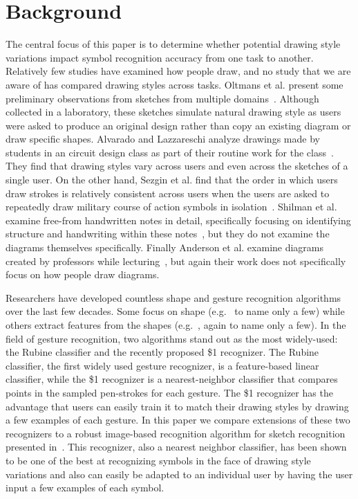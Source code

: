 \documentclass{egpubl}
\begin{document}
\section{Background}
The central focus of this paper is to determine whether potential drawing style variations impact symbol recognition accuracy from one task to another.  Relatively few studies have examined how people draw, and no study that we are aware of has compared drawing styles across tasks.  Oltmans et al. present some preliminary observations from sketches from multiple domains~\cite{Oltmans2004ETCHASketch}.  Although collected in a laboratory, these sketches simulate natural drawing style as users were asked to produce an original design rather than copy an existing diagram or draw specific shapes.  Alvarado and Lazzareschi analyze drawings made by students in an circuit design class as part of their routine work for the class~\cite{Alvarado2007Properties}.  They find that drawing styles vary across users and even across the sketches of a single user.  On the other hand, Sezgin et al. find that the order in which users draw strokes is relatively consistent across users when the users are asked to repeatedly draw military course of action symbols in isolation~\cite{Sezgin2007Sketch}.  Shilman et al. examine free-from handwritten notes in detail, specifically focusing on identifying structure and handwriting within these notes~\cite{Shilman2003Discerning}, but they do not examine the diagrams themselves specifically.  Finally
Anderson et al. examine diagrams created by professors
while lecturing~\cite{Anderson2005Study}, but again their work does not specifically focus on how people draw diagrams.
  
Researchers have developed countless shape and gesture recognition algorithms over the last few decades.  Some focus on shape (e.g.~\cite{Hammond2004Automatically,Alvarado2004SketchREAD,Miller2005Data,Kara2005ImageBased,dollar} to name only a few) while others extract features from the shapes (e.g.~\cite{Blagojevic2008Data,Hse2004ssr,rubine,Fonseca02cali,Lee2006Efficient}, again to name only a few).  In the field of gesture recognition, two algorithms stand out as the most widely-used: the Rubine classifier and the recently proposed \$1 recognizer.  The Rubine classifier, the first widely used gesture recognizer, is a feature-based linear classifier, while the \$1 recognizer is a nearest-neighbor classifier that compares points in the sampled pen-strokes for each gesture.  The \$1 recognizer has the advantage that users can easily train it to match their drawing styles by drawing a few examples of each gesture.  In this paper we compare extensions of these two recognizers to a robust image-based recognition algorithm for sketch recognition presented in~\cite{Kara2005ImageBased}.  This recognizer, also a nearest neighbor classifier, has been shown to be one of the best at recognizing symbols in the face of drawing style variations and also can easily be adapted to an individual user by having the user input a few examples of each symbol. 
\end{document}
